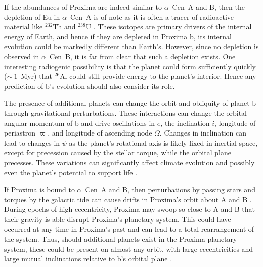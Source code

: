 \documentclass[preprint,12pt]{aastex}
\def\eg{{\it e.g.\ }}
\def\acen{{$\alpha$~Cen}}
\begin{document}
If the abundances of Proxima are indeed similar to \acen~A and B, then
the depletion of Eu in \acen~A is of note as it is often a tracer
of radioactive material like $^{232}$Th and $^{238}$U
\citep{Young14}. These isotopes are primary drivers of the internal
energy of Earth, and hence if they are depleted in Proxima b, its
internal evolution could be markedly different than Earth's. However,
since no depletion is observed in \acen~B, it is far from clear that
such a depletion exists. One interesting radiogenic possibility is
that the planet could form sufficiently quickly ($\sim~1$~Myr) that
$^{26}$Al could still provide energy to the planet's interior. Hence any
prediction of b's evolution should also consider its role.

The presence of additional planets can change the orbit and obliquity
of planet b through gravitational perturbations. These interactions
can change the orbital angular momentum of b and drive oscillations in
$e$, the inclination $i$, longitude of periastron $\varpi$, and
longitude of ascending node $\Omega$. Changes in inclination can lead
to changes in $\psi$ as the planet's rotational axis is likely fixed
in inertial space, except for precession caused by the stellar torque,
while the orbital plane precesses. These variations can significantly
affect climate evolution and possibly even the planet's potential to
support life \citep{Armstrong14}. 

If Proxima is bound to \acen~A and B, then perturbations by passing
stars and torques by the galactic tide can cause drifts in Proxima's
orbit about A and B \citep{Kaib13}. During epochs of high
eccentricity, Proxima may swoop so close to A and B that their gravity
is able disrupt Proxima's planetary system. This could have occurred
at any time in Proxima's past and can lead to a total rearrangement of
the system. Thus, should additional planets exist in the Proxima
planetary system, these could be present on almost any orbit, with
large eccentricities and large mutual inclinations relative to b's
orbital plane \citep[\eg][]{Barnes11}.
\end{document}

